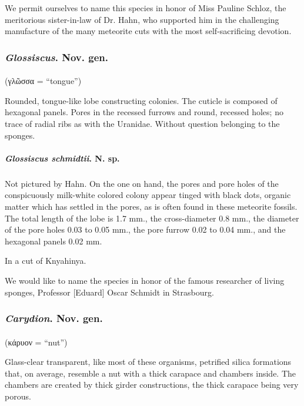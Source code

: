 \documentclass[a4paper, 12pt, oneside]{article}
\begin{document}
We permit ourselves to name this species in honor of Miss Pauline Schloz, the meritorious sister-in-law of Dr. Hahn, who supported him in the challenging manufacture of the many meteorite cuts with the most self-sacrificing devotion.
\clearpage %
\subsubsection{\emph{Glossiscus}. Nov. gen.}
\paragraph*{}
(γλῶσσα = ``tongue'')%

Rounded, tongue-like lobe constructing colonies. The cuticle is composed of hexagonal panels. Pores in the recessed furrows and round, recessed holes; no trace of radial ribs as with the Uranidae. Without question belonging to the sponges.
\paragraph{\emph{Glossiscus schmidtii}. N. sp.}
\subparagraph{}
Not pictured by Hahn. On the one on hand, the pores and pore holes of the conspicuously milk-white colored colony appear tinged with black dots, organic matter which has settled in the pores, as is often found in these meteorite fossils. The total length of the lobe is 1.7 mm., the cross-diameter 0.8 mm., the diameter of the pore holes 0.03 to 0.05 mm., the pore furrow 0.02 to 0.04 mm., and the hexagonal panels 0.02 mm.

In a cut of Knyahinya.

We would like to name the species in honor of the famous researcher of living sponges, Professor [Eduard] Oscar Schmidt in Strasbourg.
\subsubsection{\emph{Carydion}. Nov. gen.}
\paragraph*{}
(κάρυον = ``nut'')%

Glass-clear transparent, like most of these organisms, petrified silica formations that, on average, resemble a nut with a thick carapace and chambers inside. The chambers are created by thick girder constructions, the thick carapace being very porous.
\end{document}
